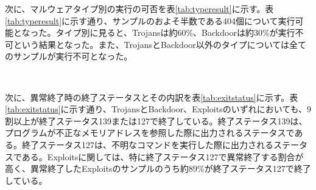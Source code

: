 \documentclass[12pt,a4paper,titlepage,report]{jsbook}
\begin{document}
次に、マルウェアタイプ別の実行の可否を表\ref{tab:typeresult}に示す。表\ref{tab:typeresult}に示す通り、サンプルのおよそ半数である404個について実行可能となった。タイプ別に見ると、Trojansは約60\%、Backdoorは約30\%が実行不可という結果となった。また、TrojansとBackdoor以外のタイプについては全てのサンプルが実行不可となった。

\begin{table}[htbp]
	\caption{マルウェアタイプ別の実行の可否}
	\label{tab:typeresult}
	\centering
	\\
\end{table}

次に、異常終了時の終了ステータスとその内訳を表\ref{tab:exitstatus}に示す。表\ref{tab:exitstatus}に示す通り、TrojansとBackdoor、Exploitsのいずれにおいても、9割以上が終了ステータス139または127で終了している。終了ステータス139は、プログラムが不正なメモリアドレスを参照した際に出力されるステータスである。終了ステータス127は、不明なコマンドを実行した際に出力されるステータスである。Exploitsに関しては、特に終了ステータス127で異常終了する割合が高く、異常終了したExploitsのサンプルのうち約89\%が終了ステータス127で終了している。

\begin{table}[htbp]
	\caption{異常終了時の終了ステータスとその内訳}
	\label{tab:exitstatus}
	\centering
	\\
\end{table}
\end{document}
